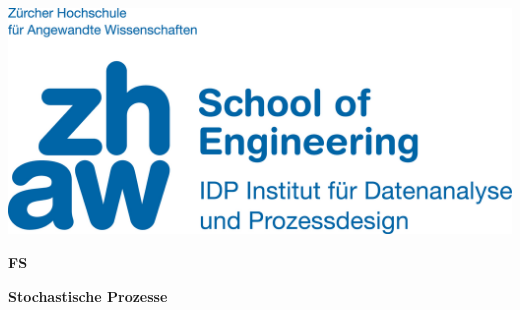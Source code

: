 \noindent
\begin{minipage}[t]{0.4\textwidth} 
\includegraphics[width=\linewidth]{logo.jpg}
\end{minipage}%
\hfill%
\begin{minipage}[t]{0.4\textwidth}\raggedleft
\textbf{\large FS \the\year}
\end{minipage}

\begin{center}
 \textbf{\large Stochastische Prozesse} \\
 \vspace{0.3cm}
\end{center}
